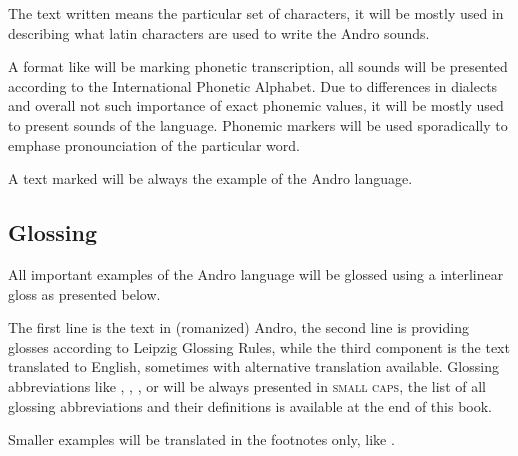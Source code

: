 The text written  means the particular set of characters, it will
be mostly used in describing what latin characters are used to write the Andro
sounds.

A format like  will be marking phonetic transcription, all
sounds will be presented according to the International Phonetic Alphabet. Due
to differences in dialects and overall not such importance of exact phonemic
values, it will be mostly used to present sounds of the language. Phonemic
markers  will be used sporadically to emphase pronounciation of
the particular word.

A text marked  will be always the example of the Andro
language.

\subsection{Glossing}

All important examples of the Andro language will be glossed using a interlinear
gloss as presented below.


The first line is the text in (romanized) Andro, the second line is providing
glosses according to Leipzig Glossing Rules, while the third component is the
text translated to English, sometimes with alternative translation available.
Glossing abbreviations like \Dem{}, \Nan{}, \Rel{}, \Refl{} or \Top{} will be
always presented in \textsc{small caps}, the list of all glossing abbreviations
and their definitions is available at the end of this book.

Smaller examples will be translated in the footnotes only, like
.